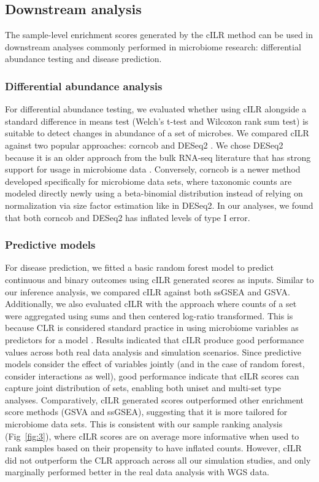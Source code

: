 \documentclass[10pt,letterpaper]{article}
\begin{document}
\subsection*{Downstream analysis}
The sample-level enrichment scores generated by the cILR method can be used in downstream analyses commonly performed in microbiome research: differential abundance testing and disease prediction.

\subsubsection*{Differential abundance analysis}
For differential abundance testing, we evaluated whether using cILR alongside a standard difference in means test (Welch's t-test and Wilcoxon rank sum test) is suitable to detect changes in abundance of a set of microbes. We compared cILR against two popular approaches: corncob \cite{martin2020} and DESeq2 \cite{love2014}. We chose DESeq2 because it is an older approach from the bulk RNA-seq literature that has strong support for usage in microbiome data \cite{mcmurdie2014}. Conversely, corncob is a newer method developed specifically for microbiome data sets, where taxonomic counts are modeled directly newly using a beta-binomial distribution instead of relying on normalization via size factor estimation like in DESeq2. In our analyses, we found that both corncob and DESeq2 has inflated levels of type I error.

\subsubsection*{Predictive models}
For disease prediction, we fitted a basic random forest model \cite{breiman2001} to predict continuous and binary outcomes using cILR generated scores as inputs. Similar to our inference analysis, we compared cILR against both ssGSEA and GSVA. Additionally, we also evaluated cILR with the approach where counts of a set were aggregated using sums and then centered log-ratio transformed. This is because CLR is considered standard practice in using microbiome variables as predictors for a model \cite{gloor2017}. Results indicated that cILR produce good performance values across both real data analysis and simulation scenarios. Since predictive models consider the effect of variables jointly (and in the case of random forest, consider interactions as well), good performance indicate that cILR scores can capture joint distribution of sets, enabling both uniset and multi-set type analyses. Comparatively, cILR generated scores outperformed other enrichment score methods (GSVA and ssGSEA), suggesting that it is more tailored for microbiome data sets. This is consistent with our sample ranking analysis (Fig~\ref{fig:3}), where cILR scores are on average more informative when used to rank samples based on their propensity to have inflated counts. However, cILR did not outperform the CLR approach across all our simulation studies, and only marginally performed better in the real data analysis with WGS data. 
\end{document}
